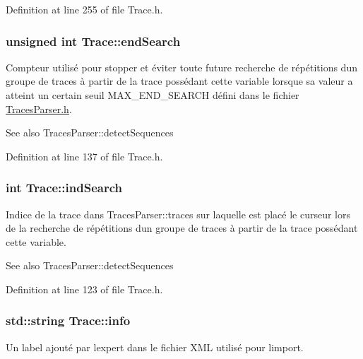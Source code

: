 Definition at line 255 of file Trace.\+h.

\subsubsection[{\texorpdfstring{end\+Search}{endSearch}}]{\setlength{\rightskip}{0pt plus 5cm}unsigned int Trace\+::end\+Search}\hypertarget{class_trace_a8c8413995806feaeebda9f5360db9dbd}{}\label{class_trace_a8c8413995806feaeebda9f5360db9dbd}
Compteur utilisé pour stopper et éviter toute future recherche de répétitions d\textquotesingle{}un groupe de traces à partir de la trace possédant cette variable lorsque sa valeur a atteint un certain seuil M\+A\+X\+\_\+\+E\+N\+D\+\_\+\+S\+E\+A\+R\+CH défini dans le fichier \hyperlink{_traces_parser_8h}{Traces\+Parser.\+h}.

\begin{DoxySeeAlso}{See also}
Traces\+Parser\+::detect\+Sequences 
\end{DoxySeeAlso}


Definition at line 137 of file Trace.\+h.

\subsubsection[{\texorpdfstring{ind\+Search}{indSearch}}]{\setlength{\rightskip}{0pt plus 5cm}int Trace\+::ind\+Search}\hypertarget{class_trace_ae1aa55b6282f5dae12f63b0282ef4b9d}{}\label{class_trace_ae1aa55b6282f5dae12f63b0282ef4b9d}
Indice de la trace dans Traces\+Parser\+::traces sur laquelle est placé le curseur lors de la recherche de répétitions d\textquotesingle{}un groupe de traces à partir de la trace possédant cette variable.

\begin{DoxySeeAlso}{See also}
Traces\+Parser\+::detect\+Sequences 
\end{DoxySeeAlso}


Definition at line 123 of file Trace.\+h.

\subsubsection[{\texorpdfstring{info}{info}}]{\setlength{\rightskip}{0pt plus 5cm}std\+::string Trace\+::info\hspace{0.3cm}{\ttfamily [protected]}}\hypertarget{class_trace_a4835dcfa7da5d4c971e8f7d6860acb09}{}\label{class_trace_a4835dcfa7da5d4c971e8f7d6860acb09}
Un label ajouté par l\textquotesingle{}expert dans le fichier X\+ML utilisé pour l\textquotesingle{}import. 

